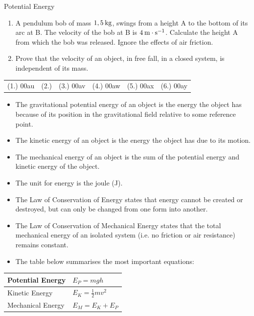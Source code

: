\begin{exercises}{Potential Energy }
\begin{enumerate}[noitemsep, label=\textbf{\arabic*}. ]
\item A pendulum bob of mass $1,5\phantom{\rule{2pt}{0ex}}\text{kg}$, swings from a height A to the bottom of its arc at B. The velocity of the bob at B is $4\phantom{\rule{2pt}{0ex}}\text{m}\ensuremath{\cdot}\text{s}{}^{-1}$. Calculate the height A from which the bob was released. Ignore the effects of air friction.\newline
\item Prove that the velocity of an object, in free fall, in a closed system, is independent of its mass.\newline
\end{enumerate}
\par \practiceinfo
\par \begin{tabular}[h]{cccccc}
(1.) 00au  & (2.) & (3.) 00av  &  (4.) 00aw  &  (5.) 00ax  &  (6.) 00ay \end{tabular}
\end{exercises}
\clearpage
{}
            \nopagebreak
      \label{m38786*id70947}\begin{itemize}[noitemsep]
\item The gravitational potential energy of an object is the energy the object has because of its position in the gravitational field relative to some reference point.
\item The kinetic energy of an object is the energy the object has due to its motion.
\item The mechanical energy of an object is the sum of the potential energy and kinetic energy of the object.
\item The unit for energy is the joule (J).
\item The Law of Conservation of Energy states that energy cannot be created or destroyed, but can only be changed from one form into another.
\item The Law of Conservation of Mechanical Energy states that the total mechanical energy of an isolated system (i.e. no friction or air resistance) remains constant.
\item The table below summarises the most important equations:
\end{itemize}
          \begin{table}[H]
        \begin{center}
      \label{m38786*id71092}
    \noindent
      \begin{tabular}{|l|l|}\hline
        Potential Energy &
                ${E}_{P}=mgh$
             \\ \hline
        Kinetic Energy &
                ${E}_{K}=\frac{1}{2}m{v}^{2}$
              \\ \hline
        Mechanical Energy &
                ${E}_{M}={E}_{K}+{E}_{P}$
            \\ \hline
    \end{tabular}
      \end{center}
\end{table}
